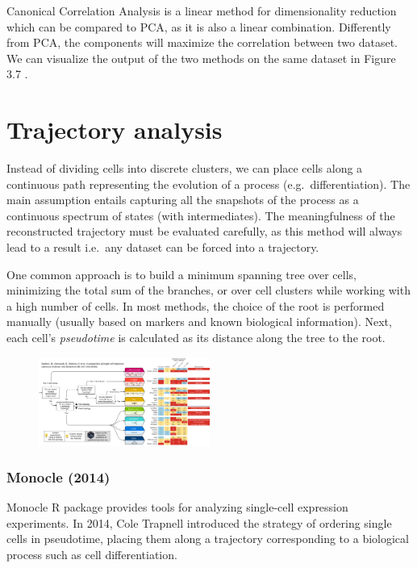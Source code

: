 Canonical Correlation Analysis is a linear method for dimensionality
reduction which can be compared to PCA, as it is also a linear
combination. Differently from PCA, the components will maximize the
correlation between two dataset. We can visualize the output of the two
methods on the same dataset in Figure 3.7 .

\hypertarget{trajectory-analysis}{%
\section{Trajectory analysis}\label{trajectory-analysis}}

Instead of dividing cells into discrete clusters, we can place cells
along a continuous path representing the evolution of a process
(e.g.~differentiation). The main assumption entails capturing all the
snapshots of the process as a continuous spectrum of states (with
intermediates). The meaningfulness of the reconstructed trajectory must
be evaluated carefully, as this method will always lead to a result
i.e.~any dataset can be forced into a trajectory.

One common approach is to build a minimum spanning tree over cells,
minimizing the total sum of the branches, or over cell clusters while
working with a high number of cells. In most methods, the choice of the
root is performed manually (usually based on markers and known
biological information). Next, each cell's \emph{pseudotime} is
calculated as its distance along the tree to the root.

\begin{figure}
\centering
\includegraphics[width=0.5\textwidth]{images/Screen_Shot_2023-02-22_at_19-10-01.png}
\caption{}
\end{figure}

\hypertarget{monocle-2014}{%
\subsubsection{Monocle (2014)}\label{monocle-2014}}

Monocle R package provides tools for analyzing single-cell expression
experiments. In 2014, Cole Trapnell introduced the strategy of ordering
single cells in pseudotime, placing them along a trajectory
corresponding to a biological process such as cell differentiation.

